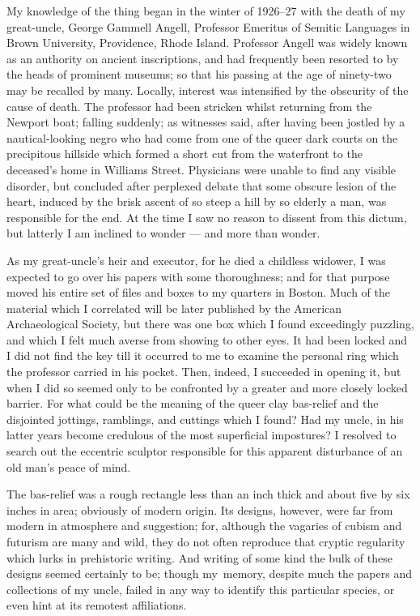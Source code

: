 My knowledge of the thing began in the winter of 1926--27 with the death
of my great-uncle, George Gammell Angell, Professor Emeritus of Semitic
Languages in Brown University, Providence, Rhode Island. Professor
Angell was widely known as an authority on ancient inscriptions, and had
frequently been resorted to by the heads of prominent museums; so that
his passing at the age of ninety-two may be recalled by many. Locally,
interest was intensified by the obscurity of the cause of death. The
professor had been stricken whilst returning from the Newport boat;
falling suddenly; as witnesses said, after having been jostled by a
nautical-looking negro who had come from one of the queer dark courts on
the precipitous hillside which formed a short cut from the waterfront to
the deceased's home in Williams Street. Physicians were unable to find
any visible disorder, but concluded after perplexed debate that some
obscure lesion of the heart, induced by the brisk ascent of so steep a
hill by so elderly a man, was responsible for the end. At the time I saw
no reason to dissent from this dictum, but latterly I am inclined to
wonder --- and more than wonder.

\pagebreak


As my great-uncle's heir and executor, for he died a childless widower,
I was expected to go over his papers with some thoroughness; and for
that purpose moved his entire set of files and boxes to my quarters in
Boston. Much of the material which I correlated will be later published
by the American Archaeological Society, but there was one box which I
found exceedingly puzzling, and which I felt much averse from showing to
other eyes. It had been locked and I did not find the key till it
occurred to me to examine the personal ring which the professor carried
in his pocket. Then, indeed, I succeeded in opening it, but when I did
so seemed only to be confronted by a greater and more closely locked
barrier. For what could be the meaning of the queer clay bas-relief and
the disjointed jottings, ramblings, and cuttings which I found? Had my
uncle, in his latter years become credulous of the most superficial
impostures? I resolved to search out the eccentric sculptor responsible
for this apparent disturbance of an old man's peace of mind.

The bas-relief was a rough rectangle less than an inch thick and about
five by six inches in area; obviously of modern origin. Its designs,
however, were far from modern in atmosphere and suggestion; for,
although the vagaries of cubism and futurism are many and wild, they do
not often reproduce that cryptic regularity which lurks
in prehistoric
writing. And writing of some kind the bulk of these designs seemed
certainly to be; though my\est\ memory, despite much the papers and
collections of my uncle, failed in any way to identify this particular
species, or even hint at its remotest affiliations.

